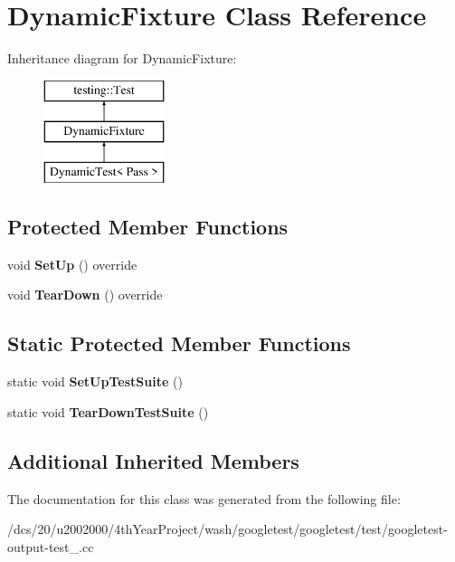 \hypertarget{classDynamicFixture}{}\section{Dynamic\+Fixture Class Reference}
\label{classDynamicFixture}
Inheritance diagram for Dynamic\+Fixture\+:\begin{figure}[H]
\begin{center}
\leavevmode
\includegraphics[height=3.000000cm]{classDynamicFixture}
\end{center}
\end{figure}
\subsection*{Protected Member Functions}
\begin{DoxyCompactItemize}
\item 
\mbox{\label{classDynamicFixture_a1439886d8a6972815b60a216d731a115}} 
void {\bfseries Set\+Up} () override
\item 
\mbox{\label{classDynamicFixture_a10e8ae5b963b80a99ad8892bc4974aac}} 
void {\bfseries Tear\+Down} () override
\end{DoxyCompactItemize}
\subsection*{Static Protected Member Functions}
\begin{DoxyCompactItemize}
\item 
\mbox{\label{classDynamicFixture_ae6e3117ba3fcc3108ac094d96ea441d6}} 
static void {\bfseries Set\+Up\+Test\+Suite} ()
\item 
\mbox{\label{classDynamicFixture_a907d5981006ea512b9cf3f7819583fc0}} 
static void {\bfseries Tear\+Down\+Test\+Suite} ()
\end{DoxyCompactItemize}
\subsection*{Additional Inherited Members}


The documentation for this class was generated from the following file\+:\begin{DoxyCompactItemize}
\item 
/dcs/20/u2002000/4th\+Year\+Project/wash/googletest/googletest/test/googletest-\/output-\/test\+\_\+.\+cc\end{DoxyCompactItemize}
